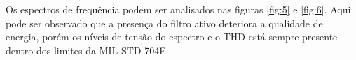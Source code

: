 Os espectros de frequência podem ser analisados nas figuras \ref{fig:5} e \ref{fig:6}. Aqui pode ser observado que a presença do filtro ativo deteriora a qualidade de energia, porém os níveis de tensão do espectro e o THD está sempre presente dentro dos limites da MIL-STD 704F. 


